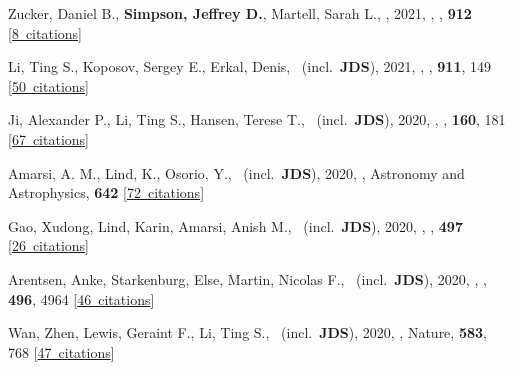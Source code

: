 \item[{\color{numcolor}\scriptsize53}] Zucker, Daniel B., \textbf{Simpson, Jeffrey D.}, Martell, Sarah L., \etal, 2021, , \apj, \textbf{912} [\href{https://ui.adsabs.harvard.edu/#abs/2021ApJ...912L..30Z}{8~citations}]

\item[{\color{numcolor}\scriptsize52}] Li, Ting S., Koposov, Sergey E., Erkal, Denis, \etal\ (incl.\ \textbf{JDS}), 2021, , \apj, \textbf{911}, 149 [\href{https://ui.adsabs.harvard.edu/#abs/2021ApJ...911..149L}{50~citations}]

\item[{\color{numcolor}\scriptsize51}] Ji, Alexander P., Li, Ting S., Hansen, Terese T., \etal\ (incl.\ \textbf{JDS}), 2020, , \aj, \textbf{160}, 181 [\href{https://ui.adsabs.harvard.edu/#abs/2020AJ....160..181J}{67~citations}]

\item[{\color{numcolor}\scriptsize50}] Amarsi, A. M., Lind, K., Osorio, Y., \etal\ (incl.\ \textbf{JDS}), 2020, , Astronomy and Astrophysics, \textbf{642} [\href{https://ui.adsabs.harvard.edu/#abs/2020A&A...642A..62A}{72~citations}]

\item[{\color{numcolor}\scriptsize49}] Gao, Xudong, Lind, Karin, Amarsi, Anish M., \etal\ (incl.\ \textbf{JDS}), 2020, , \mnras, \textbf{497} [\href{https://ui.adsabs.harvard.edu/#abs/2020MNRAS.497L..30G}{26~citations}]

\item[{\color{numcolor}\scriptsize48}] Arentsen, Anke, Starkenburg, Else, Martin, Nicolas F., \etal\ (incl.\ \textbf{JDS}), 2020, , \mnras, \textbf{496}, 4964 [\href{https://ui.adsabs.harvard.edu/#abs/2020MNRAS.496.4964A}{46~citations}]

\item[{\color{numcolor}\scriptsize47}] Wan, Zhen, Lewis, Geraint F., Li, Ting S., \etal\ (incl.\ \textbf{JDS}), 2020, , Nature, \textbf{583}, 768 [\href{https://ui.adsabs.harvard.edu/#abs/2020Natur.583..768W}{47~citations}]

